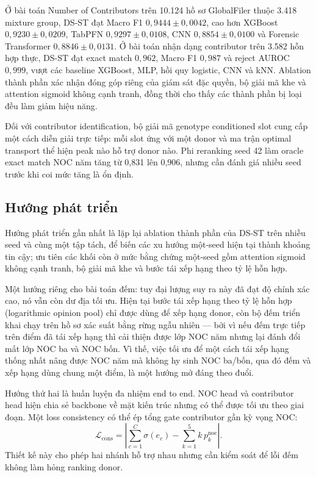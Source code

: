 \documentclass[12pt,a4paper]{article}
\begin{document}
Ở bài toán Number of Contributors trên 10.124 hồ sơ GlobalFiler thuộc 3.418 mixture group, DS-ST đạt Macro F1 \(0,9444\pm0,0042\), cao hơn XGBoost \(0,9230\pm0,0209\), TabPFN \(0,9297\pm0,0108\), CNN \(0,8854\pm0,0100\) và Forensic Transformer \(0,8846\pm0,0131\). Ở bài toán nhận dạng contributor trên 3.582 hỗn hợp thực, DS-ST đạt exact match \(0,962\), Macro F1 \(0,987\) và reject AUROC \(0,999\), vượt các baseline XGBoost, MLP, hồi quy logistic, CNN và kNN. Ablation thành phần xác nhận đóng góp riêng của giám sát đặc quyền, bộ giải mã khe và attention sigmoid không cạnh tranh, đồng thời cho thấy các thành phần bị loại đều làm giảm hiệu năng.

Đối với contributor identification, bộ giải mã genotype conditioned slot cung cấp một cách diễn giải trực tiếp: mỗi slot ứng với một donor và ma trận optimal transport thể hiện peak nào hỗ trợ donor nào. Phi reranking seed 42 làm oracle exact match NOC năm tăng từ 0,831 lên 0,906, nhưng cần đánh giá nhiều seed trước khi coi mức tăng là ổn định.

\subsection{Hướng phát triển}

Hướng phát triển gần nhất là lặp lại ablation thành phần của DS-ST trên nhiều seed và cùng một tập tách, để biến các xu hướng một-seed hiện tại thành khoảng tin cậy; ưu tiên các khối còn ở mức bằng chứng một-seed gồm attention sigmoid không cạnh tranh, bộ giải mã khe và bước tái xếp hạng theo tỷ lệ hỗn hợp.

Một hướng riêng cho bài toán đếm: tuy đại lượng suy ra này đã đạt độ chính xác cao, nó vẫn còn dư địa tối ưu. Hiện tại bước tái xếp hạng theo tỷ lệ hỗn hợp (logarithmic opinion pool) chỉ được dùng để xếp hạng donor, còn bộ đếm triển khai chạy trên hồ sơ xác suất bằng rừng ngẫu nhiên — bởi vì nếu đếm trực tiếp trên điểm đã tái xếp hạng thì cải thiện được lớp NOC năm nhưng lại đánh đổi mất lớp NOC ba và NOC bốn. Vì thế, việc tối ưu để một cách tái xếp hạng thống nhất nâng được NOC năm mà không hy sinh NOC ba/bốn, qua đó đếm và xếp hạng dùng chung một điểm, là một hướng mở đáng theo đuổi.

Hướng thứ hai là huấn luyện đa nhiệm end to end. NOC head và contributor head hiện chia sẻ backbone về mặt kiến trúc nhưng có thể được tối ưu theo giai đoạn. Một loss consistency có thể ép tổng gate contributor gần kỳ vọng NOC:
\begin{equation}
\mathcal{L}_{\mathrm{cons}}=
\left|
\sum_{c=1}^{C}\sigma(e_c)
-\sum_{k=1}^{5}k\,p_k^{\mathrm{noc}}
\right|.
\end{equation}
Thiết kế này cho phép hai nhánh hỗ trợ nhau nhưng cần kiểm soát để lỗi đếm không làm hỏng ranking donor.
\end{document}
